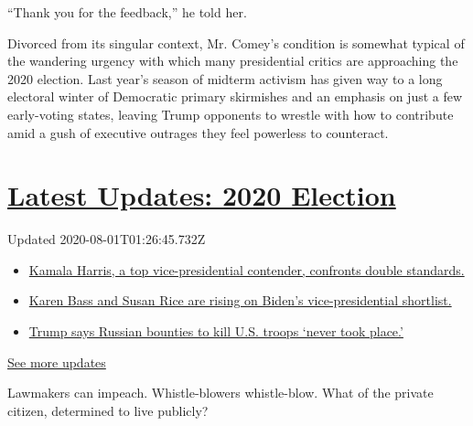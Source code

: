 ``Thank you for the feedback,'' he told her.

Divorced from its singular context, Mr. Comey's condition is somewhat
typical of the wandering urgency with which many presidential critics
are approaching the 2020 election. Last year's season of midterm
activism has given way to a long electoral winter of Democratic primary
skirmishes and an emphasis on just a few early-voting states, leaving
Trump opponents to wrestle with how to contribute amid a gush of
executive outrages they feel powerless to counteract.

\hypertarget{latest-updates-2020-election}{%
\section{\texorpdfstring{\href{https://www.nytimes.com/2020/07/31/us/elections/biden-vs-trump.html?action=click\&pgtype=Article\&state=default\&region=MAIN_CONTENT_1\&context=storylines_live_updates}{Latest
Updates: 2020
Election}}{Latest Updates: 2020 Election}}\label{latest-updates-2020-election}}

Updated 2020-08-01T01:26:45.732Z

\begin{itemize}
\tightlist
\item
  \href{https://www.nytimes.com/2020/07/31/us/elections/biden-vs-trump.html?action=click\&pgtype=Article\&state=default\&region=MAIN_CONTENT_1\&context=storylines_live_updates\#link-29fdff45}{Kamala
  Harris, a top vice-presidential contender, confronts double
  standards.}
\item
  \href{https://www.nytimes.com/2020/07/31/us/elections/biden-vs-trump.html?action=click\&pgtype=Article\&state=default\&region=MAIN_CONTENT_1\&context=storylines_live_updates\#link-13ec3d9c}{Karen
  Bass and Susan Rice are rising on Biden's vice-presidential
  shortlist.}
\item
  \href{https://www.nytimes.com/2020/07/31/us/elections/biden-vs-trump.html?action=click\&pgtype=Article\&state=default\&region=MAIN_CONTENT_1\&context=storylines_live_updates\#link-49e9a016}{Trump
  says Russian bounties to kill U.S. troops `never took place.'}
\end{itemize}

\href{https://www.nytimes.com/2020/07/31/us/elections/biden-vs-trump.html?action=click\&pgtype=Article\&state=default\&region=MAIN_CONTENT_1\&context=storylines_live_updates}{See
more updates}

Lawmakers can impeach. Whistle-blowers whistle-blow. What of the private
citizen, determined to live publicly?

